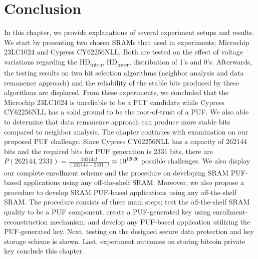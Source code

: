 \section{Conclusion}
In this chapter, we provide explanations of several experiment setups and results. We start by presenting two chosen SRAMs that used in experiments; Microchip 23LC1024 and Cypress CY62256NLL. Both are tested on the effect of voltage variations regarding the HD\textsubscript{intra}, HD\textsubscript{inter}, distribution of 1's and 0's. Afterwards, the testing results on two bit selection algorithms (neighbor analysis and data remanence approach) and the reliability of the stable bits produced by these algorithms are displayed. From these experiments, we concluded that the Microchip 23LC1024 is unreliable to be a PUF candidate while Cypress CY62256NLL has a solid ground to be the root-of-trust of a PUF. We also able to determine that data remanence approach can produce more stable bits compared to neighbor analysis.
The chapter continues with examination on our proposed PUF challenge. Since Cypress CY62256NLL has a capacity of 262144 bits and the required bits for PUF generation is 2331 bits, there are $P(262144, 2331)=\frac{262144!}{\left( 262144-2331 \right) !}\approx 10^{12626}$ possible challenges. We also display our complete enrollment scheme and the procedure on developing SRAM PUF-based applications using any off-the-shelf SRAM.
Moreover, we also propose a procedure to develop SRAM PUF-based applications using any off-the-shelf SRAM. The procedure consists of three main steps; test the off-the-shelf SRAM quality to be a PUF component, create a PUF-generated key using enrollment-reconstruction mechanism, and develop any PUF-based application utilizing the PUF-generated key.
Next, testing on the designed secure data protection and key storage scheme is shown. Last, experiment outcomes on storing bitcoin private key conclude this chapter.
